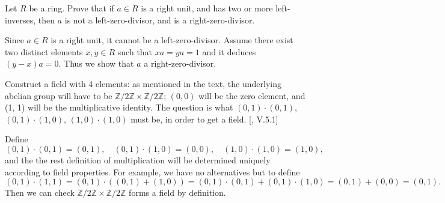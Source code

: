\documentclass[12pt,letterpaper,boxed]{hmcpset}
\begin{document}
\begin{problem}[1.10]
	Let $R$ be a ring. Prove that if $a \in R$ is a right unit, and has two or more left-inverses, then $a$ is not a left-zero-divisor, and is a right-zero-divisor.
\end{problem}
\begin{solution}
	Since $a \in R$ is a right unit, it cannot be a left-zero-divisor. Assume there exist two distinct elements $x,y\in R$ such that $xa=ya=1$ and it deduces $(y-x)a=0$. Thus we show that $a$ a right-zero-divisor.
\end{solution}

\begin{problem}[1.11]
	Construct a field with 4 elements: as mentioned in the text, the underlying
	abelian group will have to be $\mathbb{Z}/2\mathbb{Z}\times\mathbb{Z}/2\mathbb{Z}$; $(0, 0)$ will be the zero element, and (1, 1) will be the multiplicative identity. The question is what $(0, 1)\cdot(0, 1)$, $(0, 1)\cdot(1, 0)$, $(1, 0)\cdot(1, 0)$ must be, in order to get a field. [, \textsection V.5.1]
\end{problem}
\begin{solution}
	Define 
	\[
	(0, 1)\cdot(0, 1)=(0, 1),\quad (0, 1)\cdot(1, 0)=(0,0),\quad (1, 0)\cdot(1, 0)=(1, 0),
	\]
	and the the rest definition of multiplication will be determined uniquely according to field properties. For example, we have no alternatives but to define
	\[
	(0, 1)\cdot(1,1)=(0, 1)\cdot((0,1)+(1,0))=(0, 1)\cdot(0,1)+(0, 1)\cdot(1,0)=(0, 1)+(0,0)=(0,1).
	\]
	Then we can check $\mathbb{Z}/2\mathbb{Z}\times\mathbb{Z}/2\mathbb{Z}$ forms a field by definition. 
\end{solution}
\end{document}
